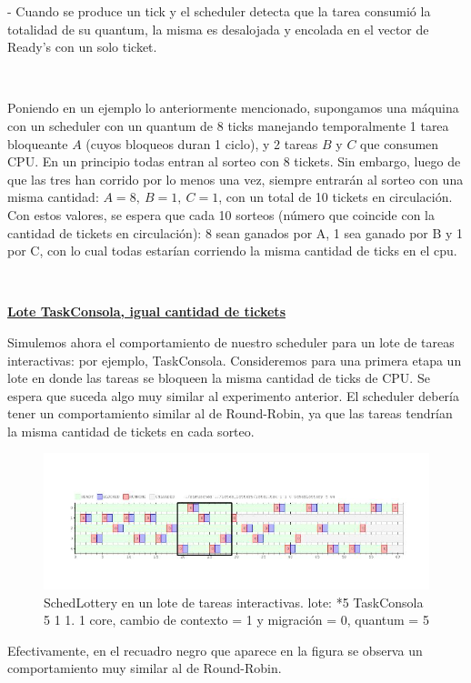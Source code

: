 - Cuando se produce un tick y el scheduler detecta que la tarea consumió la totalidad de su quantum, la misma es desalojada y encolada en el vector de Ready's con un solo ticket.

~


Poniendo en un ejemplo lo anteriormente mencionado, supongamos una máquina con un scheduler con
un quantum de 8 ticks manejando temporalmente 
1 tarea bloqueante $A$ (cuyos bloqueos duran 1 ciclo), y 2 tareas $B$ y $C$ que consumen CPU. En un principio todas entran al sorteo con 8
tickets. Sin embargo, luego de que las tres han corrido por lo menos una vez, siempre entrarán al sorteo con una misma cantidad: $A=8, \ B=1, \ C=1$, con un total de
10 tickets en circulación. Con estos valores, se espera que cada 10 sorteos (número que coincide con la cantidad de tickets en circulación): 8 sean ganados por A,
1 sea ganado por B y 1 por C, con lo cual todas estarían corriendo la misma cantidad de ticks en el cpu. 

~

\textbf{\underline{Lote TaskConsola, igual cantidad de tickets}}

Simulemos ahora el comportamiento de nuestro scheduler para un lote de tareas interactivas: por ejemplo, TaskConsola.
Consideremos para una primera etapa un lote en donde las tareas se bloqueen la misma cantidad de ticks de CPU. Se espera que suceda algo muy similar
al experimento anterior. El scheduler debería tener un comportamiento similar al de Round-Robin, ya que las tareas tendrían la misma cantidad de tickets
en cada sorteo.
 
\begin{figure}[H]
  \centering\includegraphics[scale=0.5]{graficos/lottery_console.jpg}
  \caption{SchedLottery en un lote de tareas interactivas. lote: *5 TaskConsola 5 1 1.
	1 core, cambio de contexto = 1 y migración = 0, quantum = 5}
\end{figure}
 
Efectivamente, en el recuadro negro que aparece en la figura se observa un comportamiento muy similar al de Round-Robin.

